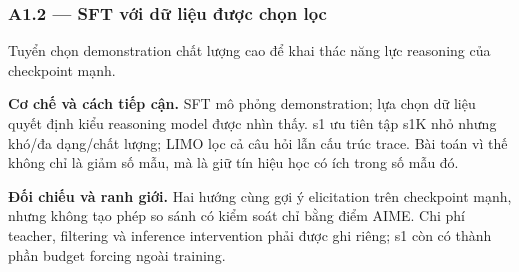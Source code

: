 \subsubsection*{A1.2 — SFT với dữ liệu được chọn lọc}
Tuyển chọn demonstration chất lượng cao để khai thác năng lực reasoning của checkpoint mạnh.

\noindent\textbf{Cơ chế và cách tiếp cận.} SFT mô phỏng demonstration; lựa chọn dữ liệu quyết định kiểu reasoning model được nhìn thấy. s1 ưu tiên tập s1K nhỏ nhưng khó/đa dạng/chất lượng; LIMO lọc cả câu hỏi lẫn cấu trúc trace. Bài toán vì thế không chỉ là giảm số mẫu, mà là giữ tín hiệu học có ích trong số mẫu đó.\par
\noindent\textbf{Đối chiếu và ranh giới.} Hai hướng cùng gợi ý elicitation trên checkpoint mạnh, nhưng không tạo phép so sánh có kiểm soát chỉ bằng điểm AIME. Chi phí teacher, filtering và inference intervention phải được ghi riêng; s1 còn có thành phần budget forcing ngoài training.\par

